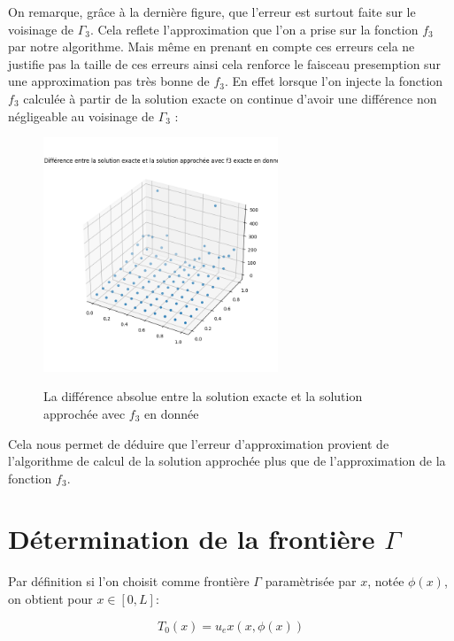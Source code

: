 \documentclass{article}
\begin{document}
\vspace{1cm}

On remarque, grâce à la dernière figure, que l'erreur est surtout faite sur le voisinage de $\Gamma_3$. Cela reflete l'approximation que l'on a prise sur la fonction $f_3$ par notre algorithme. Mais même en prenant en compte ces erreurs cela ne justifie pas la taille de ces erreurs ainsi cela renforce le faisceau presemption sur une approximation pas très bonne de $f_3$. En effet lorsque l'on injecte la fonction $f_3$ calculée à partir de la solution exacte on continue d'avoir une différence non négligeable au voisinage de $\Gamma_3$ :

\begin{figure}[h]
  \centering
  \includegraphics[width=7cm]{diff_omega_f3exacte.png}
  \label{fig/domaine}
  \caption{La différence absolue entre la solution exacte et la solution approchée avec $f_3$ en donnée}
\end{figure}

\vspace{1cm}




\newpage

Cela nous permet de déduire que l'erreur d'approximation provient de l'algorithme de calcul de la solution approchée plus que de l'approximation de la fonction $f_3$.

\section{Détermination de la frontière $\Gamma$}
Par définition si l'on choisit comme frontière $\Gamma$ paramètrisée par $x$, notée $\phi(x)$, on obtient pour $x\in [0,L]$:

\begin{equation}
    T_0(x) = u_ex(x,\phi(x))
\end{equation}
\end{document}
